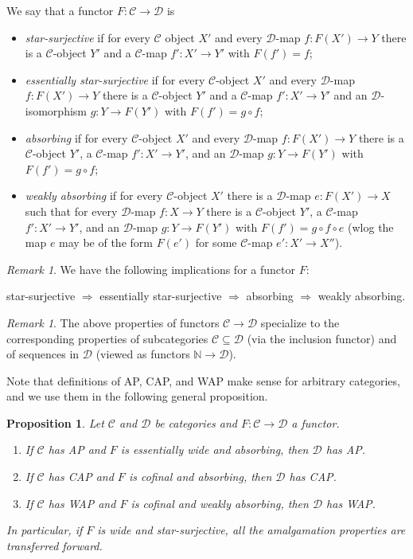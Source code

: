 \documentclass[10pt,a4paper]{article}
\newtheorem{prop}[tw]{Proposition}
\theoremstyle{definition}
\theoremstyle{remark}
\newtheorem{uwgi}[tw]{Remark}
\newcommand \maps {\colon} %
\newcommand \cmp {\circ} %
\newcommand \N {\mathbb{N}}
\newcommand \C {\mathscr{C}}
\newcommand \D {\mathscr{D}}
\begin{document}
\noindent
We say that a functor $F\colon \C\to\D$  is
\begin{itemize}
    \item {\it star-surjective} if for every $\C$ object $X'$ and every $\D$-map $f\colon F(X')\to Y$ there is a $\C$-object $Y'$ and a $\C$-map $f'\colon X'\to Y'$ with $F(f')=f$;
    
	\item {\it essentially star-surjective} if for every $\C$-object $X'$ and every $\D$-map $f\maps F(X') \to Y$ there is a $\C$-object $Y'$ and a $\C$-map $f'\maps X' \to Y'$ and an $\D$-isomorphism $g\maps Y \to F(Y')$ with $F(f') = g \circ f$;
    
    \item {\it absorbing} if for every $\C$-object $X'$ and every $\D$-map $f\maps F(X') \to Y$ there is a $\C$-object $Y'$, a $\C$-map $f'\maps X' \to Y'$, and an $\D$-map $g\maps Y \to F(Y')$ with $F(f') = g \cmp f$;  
    
	\item {\it weakly absorbing} if for every $\C$-object $X'$ there is a $\D$-map $e\maps F(X') \to X$ such that for every $\D$-map $f\maps X \to Y$ there is a $\C$-object $Y'$, a $\C$-map $f'\maps X' \to Y'$, and an $\D$-map $g\maps Y \to F(Y')$ with $F(f') = g \circ f \circ e$ (wlog the map $e$ may be of the form $F(e')$ for some $\C$-map $e'\maps X' \to X''$).
\end{itemize}

\begin{uwgi}
We have the following implications for a functor $F$:

\smallskip
\centerline{star-surjective $\Rightarrow$ essentially star-surjective $\Rightarrow$ absorbing $\Rightarrow$ weakly absorbing.}
\end{uwgi}



\begin{uwgi}
    The above properties of functors $\C \to \D$ specialize to the corresponding properties of subcategories $\C \subseteq \D$ (via the inclusion functor) and of sequences in $\D$ (viewed as functors $\N \to \D$).
\end{uwgi}



Note that definitions of AP, CAP, and WAP make sense for arbitrary categories, and we use them in the following general proposition.

\begin{prop} \label{thm:fin_transfer}
    Let $\C$ and $\D$ be categories and $F\maps \C \to \D$ a functor.
    \begin{enumerate}
        \item If $\C$ has AP and $F$ is essentially wide and absorbing, then $\D$ has AP.
        \item If $\C$ has CAP and $F$ is cofinal and absorbing, then $\D$ has CAP.
        \item If $\C$ has WAP and $F$ is cofinal and weakly absorbing, then $\D$ has WAP.
    \end{enumerate}
    In particular, if $F$ is wide and star-surjective, all the amalgamation properties are transferred forward.
\end{prop}
\end{document}

